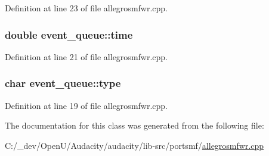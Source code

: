 Definition at line 23 of file allegrosmfwr.\+cpp.

\subsubsection[{\texorpdfstring{time}{time}}]{\setlength{\rightskip}{0pt plus 5cm}double event\+\_\+queue\+::time}\hypertarget{classevent__queue_a191d4d31576748623f3a98818ca5e387}{}\label{classevent__queue_a191d4d31576748623f3a98818ca5e387}


Definition at line 21 of file allegrosmfwr.\+cpp.

\subsubsection[{\texorpdfstring{type}{type}}]{\setlength{\rightskip}{0pt plus 5cm}char event\+\_\+queue\+::type}\hypertarget{classevent__queue_ad7842184b429f4cad057ff2055aeabdb}{}\label{classevent__queue_ad7842184b429f4cad057ff2055aeabdb}


Definition at line 19 of file allegrosmfwr.\+cpp.



The documentation for this class was generated from the following file\+:\begin{DoxyCompactItemize}
\item 
C\+:/\+\_\+dev/\+Open\+U/\+Audacity/audacity/lib-\/src/portsmf/\hyperlink{allegrosmfwr_8cpp}{allegrosmfwr.\+cpp}\end{DoxyCompactItemize}
